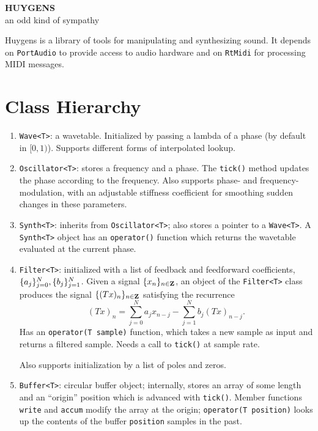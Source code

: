 \documentclass{amsart}
\DeclarePairedDelimiter{\set}{\{}{\}}
\newcommand{\Z}{\mathbf{Z}}
\newcommand{\1}{\mathbf{1}}
\begin{document}
\begin{center} {\large \textbf{HUYGENS}\\
an odd kind of sympathy} \end{center}

Huygens is a library of tools for manipulating and synthesizing sound. It depends on \texttt{PortAudio} to provide access to audio hardware and on \texttt{RtMidi} for processing MIDI messages.

\section*{Class Hierarchy}
\begin{enumerate}
  \item \texttt{Wave<T>}: a wavetable. Initialized by passing a lambda of a phase (by default in $[0,1)$). Supports different forms of interpolated lookup. 
  
  \item \texttt{Oscillator<T>}: stores a frequency and a phase. The \texttt{tick()} method updates the phase according to the frequency. Also supports phase- and frequency-modulation, with an adjustable stiffness coefficient for smoothing sudden changes in these parameters. 
  
  \item \texttt{Synth<T>}: inherits from \texttt{Oscillator<T>}; also stores a pointer to a \texttt{Wave<T>}. A \texttt{Synth<T>} object has an \texttt{operator()} function which returns the wavetable evaluated at the current phase. 
  
  \item \texttt{Filter<T>}: initialized with a list of feedback and feedforward coefficients, $\set{a_j}_{j = 0}^N, \set{b_j}_{j = 1}^N$. Given a signal $\set{x_n}_{n \in \Z}$, an object of the \texttt{Filter<T>} class produces the signal $\set{(Tx)_n}_{n \in \Z}$ satisfying the recurrence
  \[ (Tx)_n = \sum_{j=0}^N a_j x_{n-j} - \sum_{j=1}^N b_j (Tx)_{n-j}. \]
  Has an \texttt{operator(T sample)} function, which takes a new sample as input and returns a filtered sample. Needs a call to \texttt{tick()} at sample rate. 

  Also supports initialization by a list of poles and zeros. 
  
  \item \texttt{Buffer<T>}: circular buffer object; internally, stores an array of some length and an ``origin'' position which is advanced with \texttt{tick()}. Member functions \texttt{write} and \texttt{accum} modify the array at the origin; \texttt{operator(T position)} looks up the contents of the buffer \texttt{position} samples in the past. 
  

\end{enumerate}
\end{document}
